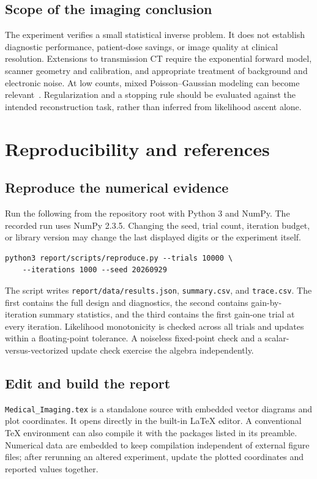 \documentclass[11pt,a4paper]{article}
\newcommand{\sectionpage}[2]{\clearpage\section{#1}\label{#2}}
\begin{document}
\subsection*{Scope of the imaging conclusion}
The experiment verifies a small statistical inverse problem. It does not establish diagnostic performance, patient-dose savings, or image quality at clinical resolution. Extensions to transmission CT require the exponential forward model, scanner geometry and calibration, and appropriate treatment of background and electronic noise. At low counts, mixed Poisson--Gaussian modeling can become relevant~\cite{ding}. Regularization and a stopping rule should be evaluated against the intended reconstruction task, rather than inferred from likelihood ascent alone.

\sectionpage{Reproducibility and references}{sec:reproduce}
\subsection*{Reproduce the numerical evidence}
Run the following from the repository root with Python 3 and NumPy. The recorded run uses NumPy 2.3.5. Changing the seed, trial count, iteration budget, or library version may change the last displayed digits or the experiment itself.
\begin{lstlisting}
python3 report/scripts/reproduce.py --trials 10000 \
    --iterations 1000 --seed 20260929
\end{lstlisting}
The script writes \texttt{report/data/results.json}, \texttt{summary.csv}, and \texttt{trace.csv}. The first contains the full design and diagnostics, the second contains gain-by-iteration summary statistics, and the third contains the first gain-one trial at every iteration. Likelihood monotonicity is checked across all trials and updates within a floating-point tolerance. A noiseless fixed-point check and a scalar-versus-vectorized update check exercise the algebra independently.

\subsection*{Edit and build the report}
\texttt{Medical\_Imaging.tex} is a standalone source with embedded vector diagrams and plot coordinates. It opens directly in the built-in LaTeX editor. A conventional TeX environment can also compile it with the packages listed in its preamble. Numerical data are embedded to keep compilation independent of external figure files; after rerunning an altered experiment, update the plotted coordinates and reported values together.
\end{document}
